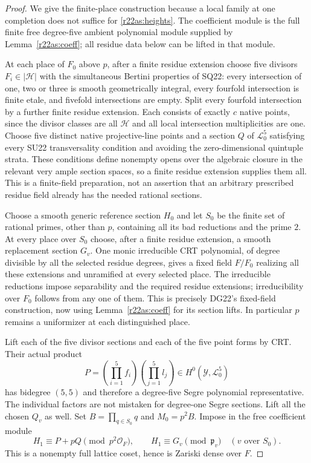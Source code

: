 \begin{proof}
We give the finite-place construction because a
local family at one completion does not suffice
for \eqref{r22as:heights}.  The coefficient module
is the full finite free degree-five ambient
polynomial module supplied by
Lemma~\ref{r22as:coeff}; all residue data below
can be lifted in that module.

At each place of $F_0$ above $p$, after a finite
residue extension choose five divisors
$F_i\in|\mathcal H|$ with the simultaneous Bertini
properties of SQ22: every intersection of one,
two or three is smooth geometrically integral,
every fourfold intersection is finite etale,
and fivefold intersections are empty.  Split
every fourfold intersection by a further finite
residue extension.  Each consists of exactly
$c$ native points, since the divisor classes
are all $\mathcal H$ and all local intersection
multiplicities are one.  Choose five distinct
native projective-line points and a section
$Q$ of $\mathcal L_0^5$ satisfying every SU22
transversality condition and avoiding the
zero-dimensional quintuple strata.
These conditions define nonempty opens over
the algebraic closure in the relevant very
ample section spaces, so a finite residue
extension supplies them all.  This is a
finite-field preparation, not an assertion
that an arbitrary prescribed residue field
already has the needed rational sections.

Choose a smooth generic reference section $H_0$
and let $S_0$ be the finite set of rational
primes, other than $p$, containing all its
bad reductions and the prime $2$.  At every
place over $S_0$ choose, after a finite residue
extension, a smooth replacement section $G_v$.
One monic irreducible CRT polynomial, of degree
divisible by all the selected residue degrees,
gives a fixed field $F/F_0$ realizing all these
extensions and unramified at every selected
place.  The irreducible reductions impose
separability and the required residue
extensions; irreducibility over $F_0$ follows
from any one of them.  This is precisely
DG22's fixed-field construction, now using
Lemma~\ref{r22as:coeff} for its section lifts.
In particular $p$ remains a uniformizer at
each distinguished place.

Lift each of the five divisor sections and
each of the five point forms by CRT.  Their
actual product
\[
 P=(\prod_{i=1}^{5}f_i)(\prod_{j=1}^{5}l_j)
               \in H^0(\mathcal Y,\mathcal L_0^5)
 \tag{AS22.9}\label{r22as:P}
\]
has bidegree $(5,5)$ and therefore a degree-five
Segre polynomial representative.  The individual
factors are not mistaken for degree-one Segre
sections.  Lift all the chosen $Q_v$ as well.
Set $B=\prod_{q\in S_0}q$ and $M_0=p^2B$.
Impose in the free coefficient module
\[
 H_1\equiv P+pQ\pmod{p^2\mathcal O_F},\qquad
 H_1\equiv G_v\pmod{\mathfrak p_v}
                         \quad(v\text{ over }S_0).
 \tag{AS22.10}\label{r22as:CRT}
\]
This is a nonempty full lattice coset, hence is
Zariski dense over $F$.


\end{proof}
